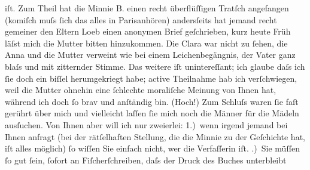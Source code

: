 \begin{ledgroupsized}[t]{13cm}
               iſt.\pend
           \pstart
           Zum Theil hat die Minnie B. einen recht
               überflüſſigen Tratſch angefangen (komiſch muſs ſich das alles in Parisanhören) andersſeits hat jemand
               recht gemeiner den Eltern Loeb einen
               anonymen Brief geſchrieben, kurz heute Früh läſst mich die Mutter bitten hinzukommen. Die Clara war nicht zu ſehen, die Anna und die Mutter verweint wie bei einem Leichenbegängnis, der Vater ganz blaſs und mit
               zitternder Stimme. Das weitere iſt unintereſſant; ich glaube daſs ich ſie doch ein
               biſſel herumgekriegt {\pb}habe;  active Theilnahme hab ich verſchwiegen, weil die
                  Mutter ohnehin eine
               ſchlechte moraliſche Meinung von Ihnen hat, während ich doch ſo brav und anſtändig
               bin. (Hoch!)\pend
           \pstart
           Zum Schluſs waren ſie faſt gerührt über mich und vielleicht laſſen ſie mich noch die Männer für die Mädeln ausſuchen. Von
               Ihnen aber will ich nur zweierlei: 1.) wenn irgend jemand bei Ihnen anfragt (bei der
               rätſelhaften Stellung, die {\pb}die
                  Minnie zu der Geſchichte hat, iſt alles
               möglich) ſo wiſſen Sie einfach nicht, wer die Verfaſſerin iſt.\pend
           .) Sie müſſen ſo gut ſein, ſofort an Fiſcherſchreiben, daſs der Druck des Buches unterbleibt

\end{ledgroupsized}
